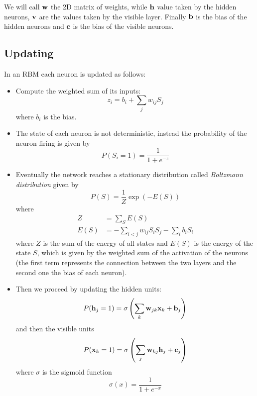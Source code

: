 \documentclass[12pt]{extarticle}
\renewcommand{\vec}[1]{\bvec{#1}}
\begin{document}
We will call $\vec w$ the 2D matrix of weights, while $\vec h$ value taken by the hidden neurons,
$\vec v$ are the values taken by the visible layer. Finally $\vec b$ is the bias of the hidden
neurons and $\vec c$ is the bias of the visible neurons.

\subsection{Updating}

In an RBM each neuron is updated as follows:
\begin{itemize}
	\item Compute the weighted sum of its inputs:
	      \begin{equation}
		      z_i = b_i + \sum_j w_{ij} S_j
	      \end{equation}
	      where $b_i$ is the bias.
	\item The state of each neuron is not deterministic, instead the probability of the neuron
	      firing is given by
	      \begin{equation}
		      P(S_i = 1) = \frac{1}{1 + e^{-z}}
	      \end{equation}

	\item Eventually the network reaches a stationary distribution called
	      \emph{Boltzmann distribution} given by
	      \begin{equation}
		      P(S) = \frac{1}{Z} \exp (-E(S))
	      \end{equation}
	      where
	      \begin{align}
		      Z    & = \sum_{S} E(S)                                  \\
		      E(S) & = - \sum_{i < j} w_{ij} S_i S_j - \sum_i b_i S_i
	      \end{align}
	      where $Z$ is the sum of the energy of all states and $E(S)$ is the energy of the state $S$,
	      which is given by the weighted sum of the activation of the neurons (the first term
	      represents the connection between the two layers and the second one the bias of each
	      neuron).

	\item Then we proceed by updating the hidden units:
	      \begin{equation}
		      P(\vec h_j = 1) = \sigma \left( \sum_k \vec w_{jk} \vec x_k + \vec b_j \right)
	      \end{equation}
	      and then the visible units
	      \begin{equation}
		      P(\vec x_k = 1) = \sigma \left( \sum_j \vec w_{kj} \vec h_j + \vec c_j \right)
	      \end{equation}
	      where $\sigma$ is the sigmoid function
	      \begin{equation}
		      \sigma(x) = \frac{1}{1 + e^{-x}}
	      \end{equation}

\end{itemize}
\end{document}
